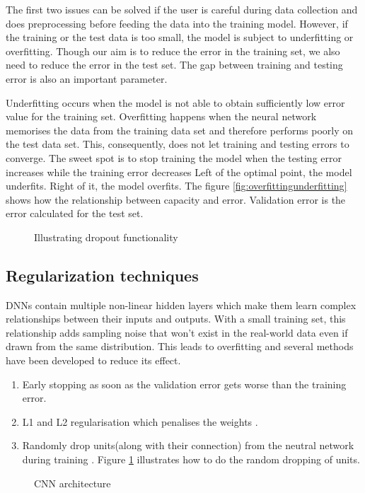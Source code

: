 The first two issues can be solved if the user is careful during data collection and does
preprocessing before feeding the data into the training model. However, if the training or
the test data is too small, the model is subject to underfitting or overfitting. Though
our aim is to reduce the error in the training set, we also need to reduce the error in
the test set. The gap between training and testing error is also an important parameter.

Underfitting occurs when the model is not able to obtain sufficiently low error value for
the training set. Overfitting happens when the neural network memorises the data from the
training data set and therefore performs poorly on the test data set. This, consequently,
does not let training and testing errors to converge. The sweet spot is to stop training the model when the testing error
increases while the training error  decreases \label{inside:formodelcheckpoint} Left of the optimal point, the model underfits. Right of
it, the model overfits. The figure \ref{fig:overfittingunderfitting} shows how the
relationship between capacity and error. Validation error is the error calculated for the test set.

\begin{figure}[!ht]
	\centering
    \def\svgwidth{0.6\textwidth}
    
    \caption{Illustrating dropout functionality}
    \label{fig:Dropout_function}
\end{figure}

\subsection{Regularization techniques}
DNNs contain multiple non-linear hidden layers which make them learn
complex relationships between their inputs and outputs. With a small training set, this
relationship adds sampling noise that won't exist in the real-world data even if drawn
from the same distribution. This leads to overfitting and several methods have been
developed to reduce its effect.
\begin{enumerate}
    \item Early stopping as soon as the validation error gets worse than the training
        error. \label{item:earlystopping}
    \item L1 and L2 regularisation which penalises the weights \cite{Schmidhuber_2015}.
    \item Randomly drop units(along with their connection) from the neutral network during
        training \cite{dropoutpaper}. Figure \ref{fig:Dropout_function} illustrates how to
        do the random dropping of units.
\end{enumerate}
\begin{figure}[!ht]
    \centering
    \def\svgwidth{\textwidth}
    
    \caption{CNN architecture}
    \label{fig:cnnarchitecture}
\end{figure}

